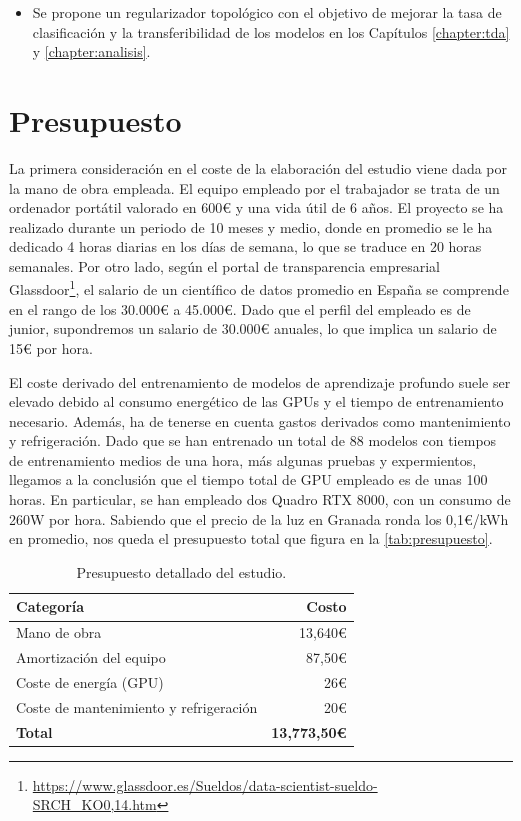 \begin{enumerate}
\begin{itemize}
		\item Se propone un regularizador topológico con el objetivo de mejorar la
		tasa de clasificación y la transferibilidad de los modelos en los Capítulos
		\ref{chapter:tda} y \ref{chapter:analisis}.
	\end{itemize}
\end{enumerate}

\section{Presupuesto}

La primera consideración en el coste de la elaboración del estudio viene dada
por la mano de obra empleada. El equipo empleado por el trabajador se trata de un
ordenador portátil valorado en 600€ y una vida útil de 6 años. El proyecto se ha
realizado durante un periodo de 10 meses y medio, donde en promedio se le ha dedicado
4 horas diarias en los días de semana, lo que se traduce en 20 horas semanales. Por
otro lado, según el portal de transparencia empresarial Glassdoor\footnote{\href{https://www.glassdoor.es/Sueldos/data-scientist-sueldo-SRCH_KO0,14.htm}{https://www.glassdoor.es/Sueldos/data-scientist-sueldo-SRCH\_KO0,14.htm}},
el salario de un científico de datos promedio en España se comprende en el rango
de los 30.000€ a 45.000€. Dado que el perfil del empleado es de junior,
supondremos un salario de 30.000€ anuales, lo que implica un salario de 15€ por
hora.

El coste derivado del entrenamiento de modelos de aprendizaje profundo suele ser
elevado debido al consumo energético de las GPUs y el tiempo de entrenamiento
necesario. Además, ha de tenerse en cuenta gastos derivados como mantenimiento y
refrigeración. Dado que se han entrenado un total de 88 modelos con tiempos de entrenamiento
medios de una hora, más algunas pruebas y expermientos, llegamos a la conclusión
que el tiempo total de GPU empleado es de unas 100 horas. En particular, se han empleado
dos Quadro RTX 8000, con un consumo de 260W por hora. Sabiendo que el precio de la
luz en Granada ronda los 0,1€/kWh en promedio, nos queda el presupuesto total
que figura en la \autoref{tab:presupuesto}.

\begin{table}[h!]
	\centering
	\begin{tabular}{|l|r|}
		\hline
		\textbf{Categoría}                     & \textbf{Costo}      \\
		\hline
		Mano de obra                           & 13,640€             \\
		\hline
		Amortización del equipo                & 87,50€              \\
		\hline
		Coste de energía (GPU)                 & 26€                 \\
		\hline
		Coste de mantenimiento y refrigeración & 20€                 \\
		\hline
		\textbf{Total}                         & \textbf{13,773,50€} \\
		\hline
	\end{tabular}
	\caption{Presupuesto detallado del estudio.}
	\label{tab:presupuesto}
\end{table}

